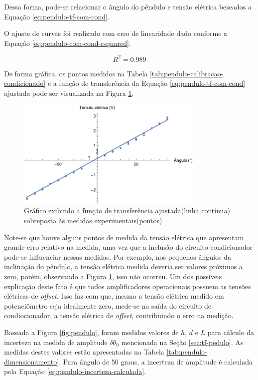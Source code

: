 \documentclass[a4paper]{instrumentacao}
\begin{document}
Dessa forma, pode-se relacionar o ângulo do pêndulo e tensão elétrica beseados a Equação \ref{eq:pendulo-tf-com-cond}.

O ajuste de curvas foi realizado com erro de linearidade dado conforme a Equação \ref{eq:pendulo-com-cond-rsquared}.

\begin{equation}
	R^2 = 0.989
	\label{eq:pendulo-com-cond-rsquared}
\end{equation}

De forma gráfica, os pontos medidos na Tabela \ref{tab:pendulo-calibracao-condicionado} e a função de transferência da Equação \ref{eq:pendulo-tf-com-cond} ajustada pode ser visualizada na Figura \ref{fig:pendulo-tf-com-cond}.

\begin{figure}[H]
\centering
\includegraphics[width=0.8\textwidth]{Pendulo-Condicionado-fit.pdf}
\caption{Gráfico exibindo a função de transferência ajustada(linha contínua) sobreposta às medidas experimentais(pontos)}
\label{fig:pendulo-tf-com-cond}
\end{figure}

Note-se que houve alguns pontos de medida da tensão elétrica que apresentam grande erro relativo na medida, uma vez que a inclusão do circuito condicionador pode-se influenciar nessas medidas. Por exemplo, nos pequenos ângulos da inclinação do pêndulo, a tensâo elétrica medida deveria ser valores próximos a zero, porém, observando a Figura \ref{fig:pendulo-tf-com-cond}, isso não ocorreu. Um dos possíveis explicação deste fato é que todos amplificadores operacionais possuem as tensões elétricas de \textit{offset}. Isso faz com que, mesmo a tensão elétrica medido em potenciômetro seja idealmente zero, mede-se na saída do circuito de condiocionador, a tensão elétrica de \textit{offset}, contribuindo o erro na medição.  

Baseada a Figura \ref{fig:pendulo}, foram medidos valores de $h$, $d$ e $L$ para cálculo da incerteza na medida de amplitude $\delta\theta_{0}$ mencionada na Seção \ref{sec:tf-pedulo}. As medidas destes valores estão apresentadas na Tabela \ref{tab:pendulo-dimensionamento}. Para ângulo de 50 graus, a incerteza de amplitude é calculada pela Equação \ref{eq:pendulo-incerteza-calculada}.
\end{document}
